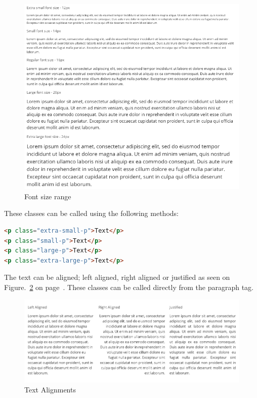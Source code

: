 \begin{figure}[h]
\centering
\includegraphics[scale=0.3]{images/fontsizes}
	\caption{Font size range}
 	\label{fig:fontSize}
\end{figure}

These classes can be called using the following methods: 

\begin{lstlisting}[language=HTML]
<p class="extra-small-p">Text</p>      
<p class="small-p">Text</p>      
<p class="large-p">Text</p>       
<p class="extra-large-p">Text</p>
\end{lstlisting}

The text can be aligned; left aligned, right aligned or justified as seen on Figure.~\ref{fig:textalign} on  page~\pageref{fig:textalign}. These classes can be called directly from the paragraph tag.

\begin{figure}[h]
\centering
\includegraphics[scale=0.2]{images/text-align}
	\caption{Text Alignments}
    \label{fig:textalign}
\end{figure}

